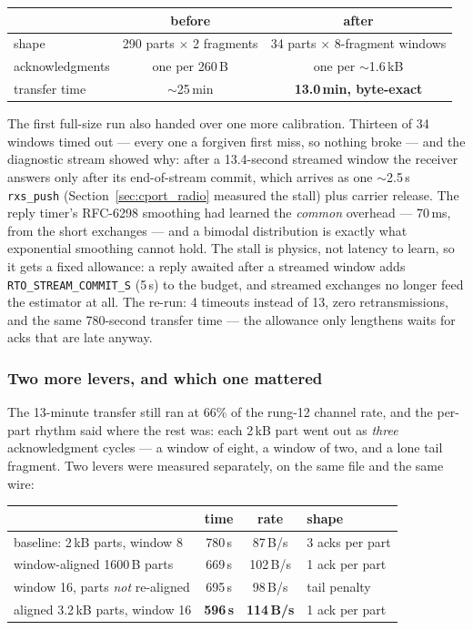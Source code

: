 \begin{center}
\begin{tabular}{lcc}
\hline
 & before & after \\
\hline
shape & 290 parts $\times$ 2 fragments & 34 parts $\times$ 8-fragment windows \\
acknowledgments & one per 260\,B & one per $\sim$1.6\,kB \\
transfer time & $\sim$25\,min & \textbf{13.0\,min, byte-exact} \\
\hline
\end{tabular}
\end{center}

The first full-size run also handed over one more calibration. Thirteen
of 34 windows timed out --- every one a forgiven first miss, so nothing
broke --- and the diagnostic stream showed why: after a 13.4-second
streamed window the receiver answers only after its end-of-stream
commit, which arrives as one $\sim$2.5\,s \texttt{rxs\_push}
(Section~\ref{sec:cport_radio} measured the stall) plus carrier
release. The reply timer's RFC-6298 smoothing had learned the
\emph{common} overhead --- 70\,ms, from the short exchanges --- and a
bimodal distribution is exactly what exponential smoothing cannot
hold. The stall is physics, not latency to learn, so it gets a fixed
allowance: a reply awaited after a streamed window adds
\texttt{RTO\_STREAM\_COMMIT\_S} (5\,s) to the budget, and streamed
exchanges no longer feed the estimator at all. The re-run: 4 timeouts
instead of 13, zero retransmissions, and the same 780-second
transfer time --- the allowance only lengthens waits for acks that are
late anyway.

\subsubsection*{Two more levers, and which one mattered}

The 13-minute transfer still ran at 66\% of the rung-12 channel rate,
and the per-part rhythm said where the rest was: each 2\,kB part went
out as \emph{three} acknowledgment cycles --- a window of eight, a
window of two, and a lone tail fragment. Two levers were measured
separately, on the same file and the same wire:

\begin{center}
\begin{tabular}{lccl}
\hline
 & time & rate & shape \\
\hline
baseline: 2\,kB parts, window 8 & 780\,s & 87\,B/s & 3 acks per part \\
window-aligned 1600\,B parts & 669\,s & 102\,B/s & 1 ack per part \\
window 16, parts \emph{not} re-aligned & 695\,s & 98\,B/s & tail penalty \\
aligned 3.2\,kB parts, window 16 & \textbf{596\,s} & \textbf{114\,B/s} & 1 ack per part \\
\hline
\end{tabular}
\end{center}

